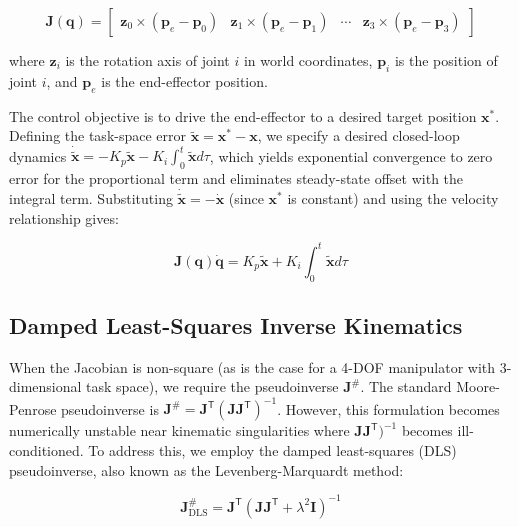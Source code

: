 \documentclass[12pt,a4paper,oneside]{report}
\begin{document}
\begin{equation}
\mathbf{J}(\mathbf{q}) = \begin{bmatrix}
\mathbf{z}_0 \times (\mathbf{p}_e - \mathbf{p}_0) & \mathbf{z}_1 \times (\mathbf{p}_e - \mathbf{p}_1) & \cdots & \mathbf{z}_3 \times (\mathbf{p}_e - \mathbf{p}_3)
\end{bmatrix}
\end{equation}

where $\mathbf{z}_i$ is the rotation axis of joint $i$ in world coordinates, $\mathbf{p}_i$ is the position of joint $i$, and $\mathbf{p}_e$ is the end-effector position.

The control objective is to drive the end-effector to a desired target position $\mathbf{x}^*$. Defining the task-space error $\tilde{\mathbf{x}} = \mathbf{x}^* - \mathbf{x}$, we specify a desired closed-loop dynamics $\dot{\tilde{\mathbf{x}}} = -K_p \tilde{\mathbf{x}} - K_i \int_0^t \tilde{\mathbf{x}} d\tau$, which yields exponential convergence to zero error for the proportional term and eliminates steady-state offset with the integral term. Substituting $\dot{\tilde{\mathbf{x}}} = -\dot{\mathbf{x}}$ (since $\mathbf{x}^*$ is constant) and using the velocity relationship gives:

\begin{equation}
\mathbf{J}(\mathbf{q}) \dot{\mathbf{q}} = K_p \tilde{\mathbf{x}} + K_i \int_0^t \tilde{\mathbf{x}} d\tau
\end{equation}

\subsection{Damped Least-Squares Inverse Kinematics}
\label{subsec:damped_least_squares_inverse_kinematics}

When the Jacobian is non-square (as is the case for a 4-DOF manipulator with 3-dimensional task space), we require the pseudoinverse $\mathbf{J}^{\#}$. The standard Moore-Penrose pseudoinverse is $\mathbf{J}^{\#} = \mathbf{J}^{\mathsf{T}} (\mathbf{J} \mathbf{J}^{\mathsf{T}})^{-1}$. However, this formulation becomes numerically unstable near kinematic singularities where $\mathbf{J} \mathbf{J}^{\mathsf{T}})^{-1}$ becomes ill-conditioned. To address this, we employ the damped least-squares (DLS) pseudoinverse, also known as the Levenberg-Marquardt method:

\begin{equation}
\mathbf{J}^{\#}_{\text{DLS}} = \mathbf{J}^{\mathsf{T}} (\mathbf{J} \mathbf{J}^{\mathsf{T}} + \lambda^2 \mathbf{I})^{-1}
\end{equation}
\end{document}
